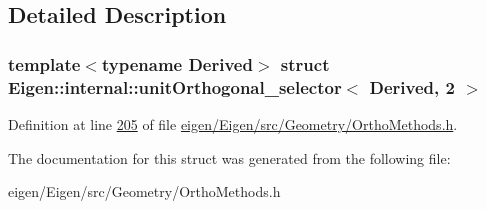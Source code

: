\subsection{Detailed Description}
\subsubsection*{template$<$typename Derived$>$\newline
struct Eigen\+::internal\+::unit\+Orthogonal\+\_\+selector$<$ Derived, 2 $>$}



Definition at line \hyperlink{eigen_2_eigen_2src_2_geometry_2_ortho_methods_8h_source_l00205}{205} of file \hyperlink{eigen_2_eigen_2src_2_geometry_2_ortho_methods_8h_source}{eigen/\+Eigen/src/\+Geometry/\+Ortho\+Methods.\+h}.



The documentation for this struct was generated from the following file\+:\begin{DoxyCompactItemize}
\item 
eigen/\+Eigen/src/\+Geometry/\+Ortho\+Methods.\+h\end{DoxyCompactItemize}

